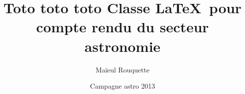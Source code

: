 \documentclass{plasci-secastro}
\date{Campagne astro 2013}
\author{Maïeul Rouquette}
\title{Toto toto toto Classe \LaTeX\ pour compte rendu du secteur astronomie}
\begin{document}
\maketitle
\lipsum
\lipsum
\end{document}
